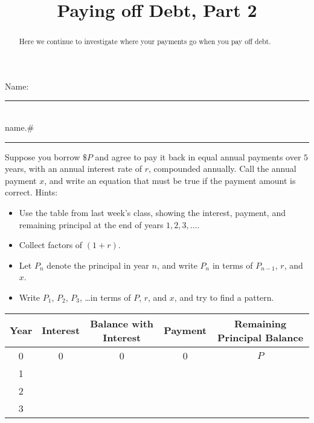 \documentclass[handout,space,nooutcomes]{ximera}
\title{Paying off Debt, Part 2}
\begin{document}
\begin{abstract}
Here we continue to investigate where your payments go when you pay off debt.
\end{abstract}
{\flushleft Name:\protect\rule[-2pt]{3in}{.5pt}\hfill \\[.5cm]name.\#\protect\rule[-2pt]{3in}{.5pt}}%
\maketitle

\begin{question}
Suppose you borrow $\$P$ and agree to pay it back in equal annual
payments over $5$ years, with an annual interest rate of $r$, compounded annually.  
Call the annual payment $x$, and write an equation that must be true if
the payment amount is correct.  Hints: 
\begin{itemize}
\item Use the table from last week's class, showing the interest, payment, and remaining
principal at the end of years $1, 2, 3, \dots$.  
\item Collect factors of $(1+r)$.
\item Let $P_n$ denote the principal in year $n$, and write $P_n$ in terms of $P_{n-1}$, $r$, and $x$.
\item Write $P_1$, $P_2$, $P_3$, \dots in terms of $P$, $r$, and $x$, and try to find a pattern.  
\end{itemize}




\def\arraystretch{2}
\begin{table}[h]
\begin{tabular}{|c|c|c|c|c|}
\hline
Year & Interest & Balance with Interest & Payment & Remaining Principal Balance \\ \hline
0    &   0     &       0            &   0    &  $P$                 \\ \hline
1    &          &                     &         &                             \\ \hline
2    &          &                     &         &                             \\ \hline
3    &          &                     &         &                             \\ \hline
\end{tabular}
\end{table}


\begin{freeResponse}
\end{freeResponse}
\end{question}
\end{document}
